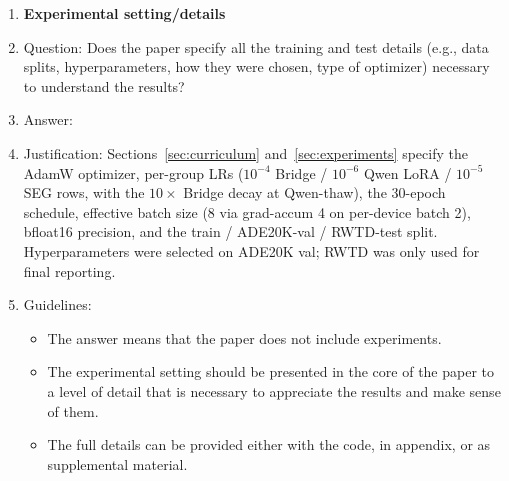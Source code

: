 \begin{enumerate}
\item {\bf Experimental setting/details}
    \item[] Question: Does the paper specify all the training and test details (e.g., data splits, hyperparameters, how they were chosen, type of optimizer) necessary to understand the results?
    \item[] Answer: \answerYes{}
    \item[] Justification: Sections~\ref{sec:curriculum} and~\ref{sec:experiments} specify the AdamW optimizer, per-group LRs ($10^{-4}$ Bridge / $10^{-6}$ Qwen LoRA / $10^{-5}$ SEG rows, with the $10\times$ Bridge decay at Qwen-thaw), the 30-epoch schedule, effective batch size (8 via grad-accum 4 on per-device batch 2), bfloat16 precision, and the train / ADE20K-val / RWTD-test split. Hyperparameters were selected on ADE20K val; RWTD was only used for final reporting.
    \item[] Guidelines:
    \begin{itemize}
        \item The answer \answerNA{} means that the paper does not include experiments.
        \item The experimental setting should be presented in the core of the paper to a level of detail that is necessary to appreciate the results and make sense of them.
        \item The full details can be provided either with the code, in appendix, or as supplemental material.
    \end{itemize}


\end{enumerate}
